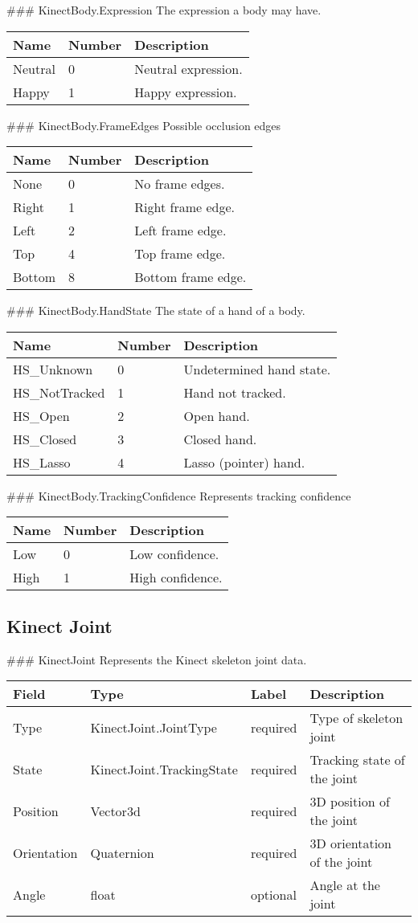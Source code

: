  \#\#\# KinectBody.Expression The expression a body may have.

\begin{longtable}[l]{@{}lll@{}}
\toprule
Name & Number & Description\tabularnewline
\midrule
\endhead
Neutral & 0 & Neutral expression.\tabularnewline
Happy & 1 & Happy expression.\tabularnewline
\bottomrule
\end{longtable}

 \#\#\# KinectBody.FrameEdges Possible occlusion edges

\begin{longtable}[l]{@{}lll@{}}
\toprule
Name & Number & Description\tabularnewline
\midrule
\endhead
None & 0 & No frame edges.\tabularnewline
Right & 1 & Right frame edge.\tabularnewline
Left & 2 & Left frame edge.\tabularnewline
Top & 4 & Top frame edge.\tabularnewline
Bottom & 8 & Bottom frame edge.\tabularnewline
\bottomrule
\end{longtable}

 \#\#\# KinectBody.HandState The state of a hand of a body.

\begin{longtable}[l]{@{}lll@{}}
\toprule
Name & Number & Description\tabularnewline
\midrule
\endhead
HS\_Unknown & 0 & Undetermined hand state.\tabularnewline
HS\_NotTracked & 1 & Hand not tracked.\tabularnewline
HS\_Open & 2 & Open hand.\tabularnewline
HS\_Closed & 3 & Closed hand.\tabularnewline
HS\_Lasso & 4 & Lasso (pointer) hand.\tabularnewline
\bottomrule
\end{longtable}

 \#\#\# KinectBody.TrackingConfidence Represents tracking confidence

\begin{longtable}[l]{@{}lll@{}}
\toprule
Name & Number & Description\tabularnewline
\midrule
\endhead
Low & 0 & Low confidence.\tabularnewline
High & 1 & High confidence.\tabularnewline
\bottomrule
\end{longtable}

\subsection{Kinect Joint}\label{kinectux5fjoint.proto}

 \#\#\# KinectJoint Represents the Kinect skeleton joint data.

\begin{longtable}[l]{@{}llll@{}}
\toprule
Field & Type & Label & Description\tabularnewline
\midrule
\endhead
Type & KinectJoint.JointType & required & Type of skeleton
joint\tabularnewline
State & KinectJoint.TrackingState & required & Tracking state of the
joint\tabularnewline
Position & Vector3d & required & 3D position of the joint\tabularnewline
Orientation & Quaternion & required & 3D orientation of the
joint\tabularnewline
Angle & float & optional & Angle at the joint\tabularnewline
\bottomrule
\end{longtable}

